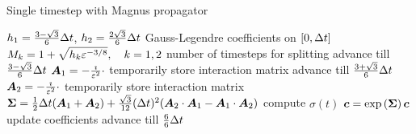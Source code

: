\begin{algorithm}[h]
	\caption{Single timestep with Magnus propagator}
	\label{alg:magnus}
	\begin{algorithmic}
	\State
		\State
		\State $h_1 = \frac{3-\sqrt{3}}{6} \Delta t$, $h_2 = \frac{2\sqrt{3}}{6} \Delta t$
		\Comment Gauss-Legendre coefficients on $[0,\Delta t]$
		\State $M_{k} = 1+\sqrt{h_{k} \varepsilon^{-3/8}}, \quad k=1,2$
		\Comment number of timesteps for splitting
		\State
		\State {}
		\Comment advance till $\frac{3-\sqrt{3}}{6} \Delta t$
		\State $\bm{A}_1 = - \frac{\imath}{\varepsilon^2} \cdot$ 
		\Comment temporarily store interaction matrix
		\State {}
		\Comment advance till $\frac{3+\sqrt{3}}{6} \Delta t$
		\State $\bm{A}_2 = - \frac{\imath}{\varepsilon^2} \cdot$ 
		\Comment temporarily store interaction matrix
		\State $\bm{\Sigma} = \frac{1}{2} \Delta t (\bm{A}_1 + \bm{A}_2) + \frac{\sqrt{3}}{12} (\Delta t)^2 (\bm{A}_2 \cdot \bm{A}_1 - \bm{A}_1 \cdot \bm{A}_2)$
		\Comment compute $\sigma (t)$
		\State $\bm{c} = \exp \left( \bm{\Sigma} \right) \bm{c}$
		\Comment update coefficients
		\State {}
		\Comment advance till $\frac{6}{6} \Delta t$
		\State
	\EndProcedure
	\end{algorithmic}
\end{algorithm}

